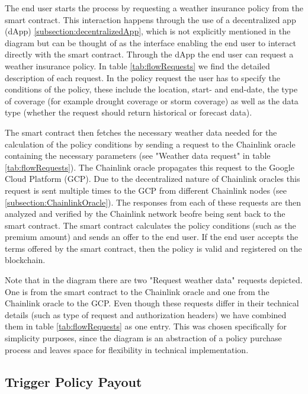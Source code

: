 The end user starts the process by requesting a weather insurance policy from the smart contract. This interaction happens through the use of a decentralized app (dApp) \cref{subsection:decentralizedApp}, which is not explicitly mentioned in the diagram but can be thought of as the interface enabling the end user to interact directly with the smart contract. Through the dApp the end user can request a weather insurance policy. In table \cref{tab:flowRequests} we find the detailed description of each request. In the policy request the user has to specify the conditions of the policy, these include the location, start- and end-date, the type of coverage (for example drought coverage or storm coverage) as well as the data type (whether the request should return historical or forecast data).

The smart contract then fetches the necessary weather data needed for the calculation of the policy conditions by sending a request to the Chainlink oracle containing the necessary parameters (see "Weather data request" in table \cref{tab:flowRequests}). The Chainlink oracle propagates this request to the Google Cloud Platform (GCP). Due to the decentralized nature of Chainlink oracles this request is sent multiple times to the GCP from different Chainlink nodes (see \cref{subsection:ChainlinkOracle}). The responses from each of these requests are then analyzed and verified by the Chainlink network beofre being sent back to the smart contract. The smart contract calculates the policy conditions (such as the premium amount) and sends an offer to the end user. If the end user accepts the terms offered by the smart contract, then the policy is valid and registered on the blockchain.

Note that in the diagram there are two "Request weather data" requests depicted. One is from the smart contract to the Chainlink oracle and one from the Chainlink oracle to the GCP. Even though these requests differ in their technical details (such as type of request and authorization headers) we have combined them in table \cref{tab:flowRequests} as one entry. This was chosen specifically for simplicity purposes, since the diagram is an abstraction of a policy purchase process and leaves space for flexibility in technical implementation.

\subsection{Trigger Policy Payout}\label{subsection:policyPayoutTrigger}

